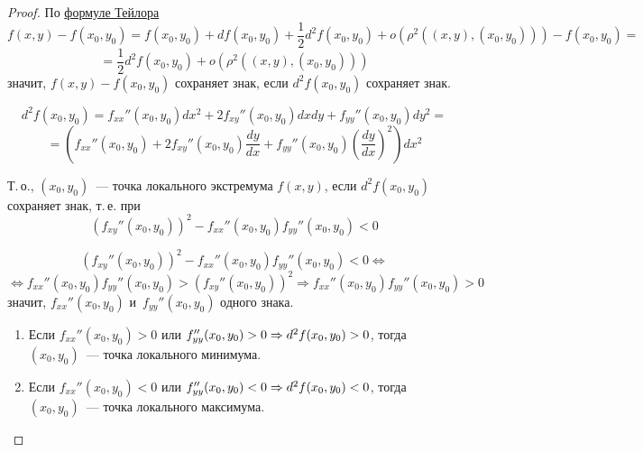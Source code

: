 \begin{proof}
По \hyperref[eq:Taylor_series_for_several_variables]{формуле Тейлора}
\begin{equation*}
f(x, y) - f(x_0, y_0) = f(x_0, y_0) + df(x_0, y_0) + \frac12 d^2f(x_0, y_0) + o(\rho^2((x, y), (x_0, y_0))) - f(x_0, y_0) =
\end{equation*}
\begin{equation*}
= \frac12 d^2f(x_0, y_0) + o(\rho^2((x, y), (x_0, y_0)))
\end{equation*}
значит, $f(x, y) - f(x_0, y_0)$ сохраняет знак, если $d^2f(x_0, y_0)$ сохраняет знак.

\begin{equation*}
d^2f(x_0, y_0) = f_{xx}''(x_0, y_0) dx^2 + 2f_{xy}''(x_0, y_0) dxdy + f_{yy}''(x_0, y_0) dy^2 =
\end{equation*}
\begin{equation*}
= \left(f_{xx}''(x_0, y_0) + 2f_{xy}''(x_0, y_0) \frac{dy}{dx} + f_{yy}''(x_0, y_0) \left(\frac{dy}{dx}\right)^2\right) dx^2
\end{equation*}

Т.\,о., $(x_0, y_0)$~--- точка локального экстремума $f(x, y)$,
если $d^2f(x_0, y_0)$ сохраняет знак, т.\,е. при
\begin{equation*}
(f_{xy}''(x_0, y_0))^2 - f_{xx}''(x_0, y_0) f_{yy}''(x_0, y_0) < 0
\end{equation*}

\begin{equation*}
(f_{xy}''(x_0, y_0))^2 - f_{xx}''(x_0, y_0) f_{yy}''(x_0, y_0) < 0 \Leftrightarrow
\end{equation*}
\begin{equation*}
\Leftrightarrow f_{xx}''(x_0, y_0) f_{yy}''(x_0, y_0) > (f_{xy}''(x_0, y_0))^2 \Rightarrow f_{xx}''(x_0, y_0) f_{yy}''(x_0, y_0) > 0
\end{equation*}
значит, $f_{xx}''(x_0, y_0)$ и~$f_{yy}''(x_0, y_0)$ одного знака.

\begin{enumerate}
	\item Если $f_{xx}''(x_0, y_0) > 0$ или $f_{yy}''(x_0, y_0) > 0 \opbr\Rightarrow d^2f(x_0, y_0) \opbr> 0$, тогда $(x_0, y_0)$~--- точка локального минимума.
	\item Если $f_{xx}''(x_0, y_0) < 0$ или $f_{yy}''(x_0, y_0) < 0 \opbr\Rightarrow d^2f(x_0, y_0) \opbr< 0$, тогда $(x_0, y_0)$~--- точка локального максимума.
\end{enumerate}
\end{proof}


